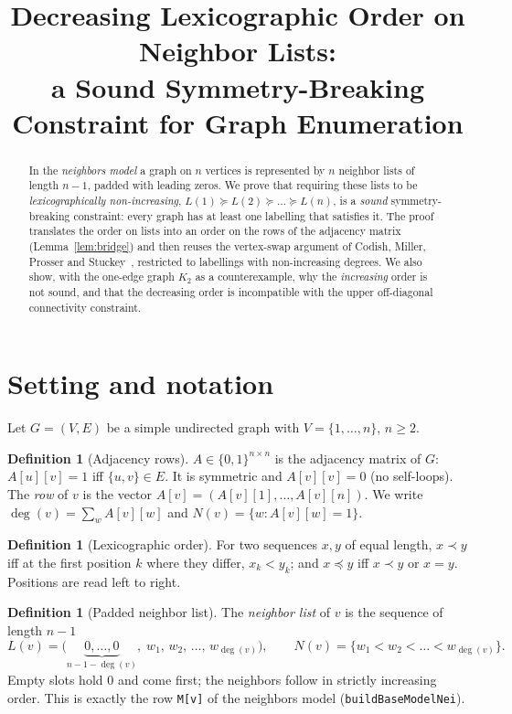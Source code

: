 \documentclass[11pt,a4paper]{article}
\title{Decreasing Lexicographic Order on Neighbor Lists:\\
a Sound Symmetry-Breaking Constraint for Graph Enumeration}
\author{}
\date{}
\theoremstyle{definition}
\newtheorem{definition}[theorem]{Definition}
\theoremstyle{remark}
\newcommand{\lex}{\preceq}
\newcommand{\slex}{\prec}
\newcommand{\nb}{N}
\newcommand{\Lst}{L}
\begin{document}
\maketitle

\begin{abstract}
In the \emph{neighbors model} a graph on $n$ vertices is represented by $n$ neighbor
lists of length $n-1$, padded with leading zeros. We prove that requiring these lists to be
\emph{lexicographically non-increasing}, $\Lst(1)\succeq \Lst(2)\succeq\dots\succeq \Lst(n)$,
is a \emph{sound} symmetry-breaking constraint: every graph has at least one labelling that
satisfies it. The proof translates the order on lists into an order on the rows of the
adjacency matrix (Lemma~\ref{lem:bridge}) and then reuses the vertex-swap argument of
Codish, Miller, Prosser and Stuckey~\cite{codish13,codish19}, restricted to labellings
with non-increasing degrees. We also show, with the one-edge graph $K_2$ as a counterexample, why the \emph{increasing}
order is not sound, and
that the decreasing order is incompatible with the upper off-diagonal connectivity constraint.
\end{abstract}

\section{Setting and notation}

Let $G=(V,E)$ be a simple undirected graph with $V=\{1,\dots,n\}$, $n\ge 2$.

\begin{definition}[Adjacency rows]
$A\in\{0,1\}^{n\times n}$ is the adjacency matrix of $G$: $A[u][v]=1$ iff $\{u,v\}\in E$.
It is symmetric and $A[v][v]=0$ (no self-loops). The \emph{row} of $v$ is the vector
$A[v]=(A[v][1],\dots,A[v][n])$. We write $\deg(v)=\sum_w A[v][w]$ and
$\nb(v)=\{w : A[v][w]=1\}$.
\end{definition}

\begin{definition}[Lexicographic order]
For two sequences $x,y$ of equal length, $x\slex y$ iff at the first position $k$ where they
differ, $x_k<y_k$; and $x\lex y$ iff $x\slex y$ or $x=y$. Positions are read left to right.
\end{definition}

\begin{definition}[Padded neighbor list]\label{def:list}
The \emph{neighbor list} of $v$ is the sequence of length $n-1$
\[
  \Lst(v)=\bigl(\underbrace{0,\dots,0}_{n-1-\deg(v)},\; w_1,\, w_2,\,\dots,\, w_{\deg(v)}\bigr),
  \qquad \nb(v)=\{w_1<w_2<\dots<w_{\deg(v)}\}.
\]
Empty slots hold $0$ and come first; the neighbors follow in strictly increasing order.
This is exactly the row \texttt{M[v]} of the neighbors model (\texttt{buildBaseModelNei}).
\end{definition}
\end{document}
